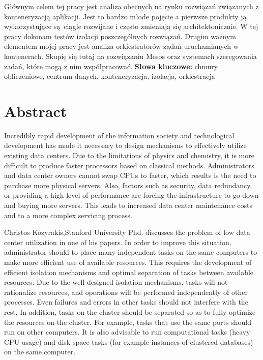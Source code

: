 \documentclass[10pt,a4paper,titlepage,twoside]{report}
\begin{document}
Głównym celem tej pracy jest analiza obecnych na rynku rozwiązań związanych z konteneryzacją aplikacji. Jest to bardzo młode pojęcie a pierwsze produkty ją wykorzystujące są ciągle rozwijane i często zmieniają się architektonicznie. W tej pracy dokonam testów izolacji poszczególnych rozwiązań. Drugim ważnym elementem mojej pracy jest analiza orkiestratorów zadań uruchamianych w kontenerach. Skupię się tutaj na rozwiązaniu Mesos oraz systemach szeregowania zadań, które mogą z nim współpracować. 
\newline
\newline
\newline
\noindent \textbf{Słowa kluczowe:} chmury obliczeniowe, centrum danych, konteneryzacja, izolacja, orkiestracja

\newpage
\section*{Abstract}

\indent\indent Incredibly rapid development of the information society and technological development has made it necessary to design mechanisms to effectively utilize existing data centers. Due to the limitations of physics and chemistry, it is more difficult to produce faster processors based on classical methods. Administrators and data center owners cannot swap CPUs to faster, which results is the need to purchase more physical servers. Also, factors such as security, data redundancy, or providing a high level of performance are forcing the infrastructure to go down and buying more servers. This leads to increased data center maintenance costs and to a more complex servicing process.

 Christos Kozyrakis,Stanford University Phd. discusses the problem of low data center utilization in one of his papers. In order to improve this situation, administrator should to place many independent tasks on the same computers to make more efficient use of available resources. This requires the development of efficient isolation mechanisms and optimal separation of tasks between available resources. Due to the well-designed isolation mechanisms, tasks will not rationalize resources, and operations will be performed independently of other processes. Even failures and errors in other tasks should not interfere with the rest. In addition, tasks on the cluster should be separated so as to fully optimize the resources on the cluster. For example, tasks that use the same ports should run on other computers. It is also advisable to run computational tasks (heavy CPU usage) and disk space tasks (for example instances of clustered databases) on the same computer.
\end{document}
